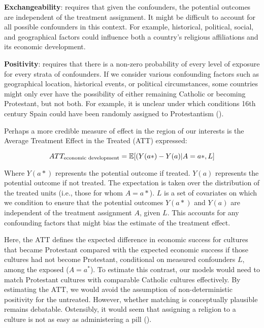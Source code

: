 \documentclass[
  single column]{article}
\begin{document}
\textbf{Exchangeability}: requires that given the confounders, the
potential outcomes are independent of the treatment assignment. It might
be difficult to account for all possible confounders in this context.
For example, historical, political, social, and geographical factors
could influence both a country's religious affiliations and its economic
development.

\textbf{Positivity}: requires that there is a non-zero probability of
every level of exposure for every strata of confounders. If we consider
various confounding factors such as geographical location, historical
events, or political circumstances, some countries might only ever have
the possibility of either remaining Catholic or becoming Protestant, but
not both. For example, it is unclear under which conditions 16th century
Spain could have been randomly assigned to Protestantism
().

Perhaps a more credible measure of effect in the region of our interests
is the Average Treatment Effect in the Treated (ATT) expressed:

\[ATT_{\textnormal{economic~development}} = \mathbb{E}[(Y(a*)- Y(a)|A = a*,L]\]

Where \(Y(a*)\) represents the potential outcome if treated. \(Y(a)\)
represents the potential outcome if not treated. The expectation is
taken over the distribution of the treated units (i.e., those for whom
\(A = a*\)). \(L\) is a set of covariates on which we condition to
ensure that the potential outcomes \(Y(a*)\) and \(Y(a)\) are
independent of the treatment assignment \(A\), given \(L\). This
accounts for any confounding factors that might bias the estimate of the
treatment effect.

Here, the ATT defines the expected difference in economic success for
cultures that became Protestant compared with the expected economic
success if those cultures had not become Protestant, conditional on
measured confounders \(L\), among the exposed (\(A = a^*\)). To estimate
this contrast, our models would need to match Protestant cultures with
comparable Catholic cultures effectively. By estimating the ATT, we
would avoid the assumption of non-deterministic positivity for the
untreated. However, whether matching is conceptually plausible remains
debatable. Ostensibly, it would seem that assigning a religion to a
culture is not as easy as administering a pill
().

\newpage{}
\end{document}
